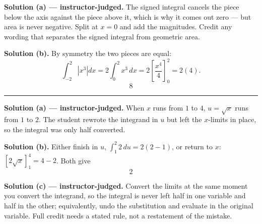 \documentclass[12pt]{article}
\begin{document}
\textbf{Solution (a) --- instructor-judged.} The signed integral cancels the
piece below the axis against the piece above it, which is why it comes out
zero --- but area is never negative. Split at $x = 0$ and add the magnitudes.
Credit any wording that separates the signed integral from geometric area.

\textbf{Solution (b).} By symmetry the two pieces are equal:
\[ \int_{-2}^{2}\left|x^3\right|dx = 2\int_0^2 x^3\,dx
   = 2\left[\frac{x^4}{4}\right]_0^2 = 2(4). \]
\[ \boxed{8} \]

\vspace{0.15cm}\noindent\rule{\linewidth}{0.2pt}


\textbf{Solution (a) --- instructor-judged.} When $x$ runs from $1$ to $4$,
$u = \sqrt{x}$ runs from $1$ to $2$. The student rewrote the integrand in $u$
but left the $x$-limits in place, so the integral was only half converted.

\textbf{Solution (b).} Either finish in $u$, $\int_1^2 2\,du = 2(2-1)$, or
return to $x$: $\left[2\sqrt{x}\right]_1^4 = 4 - 2$. Both give
\[ \boxed{2} \]

\textbf{Solution (c) --- instructor-judged.} Convert the limits at the same
moment you convert the integrand, so the integral is never left half in one
variable and half in the other; equivalently, undo the substitution and evaluate
in the original variable. Full credit needs a stated rule, not a restatement of
the mistake.
\end{document}

